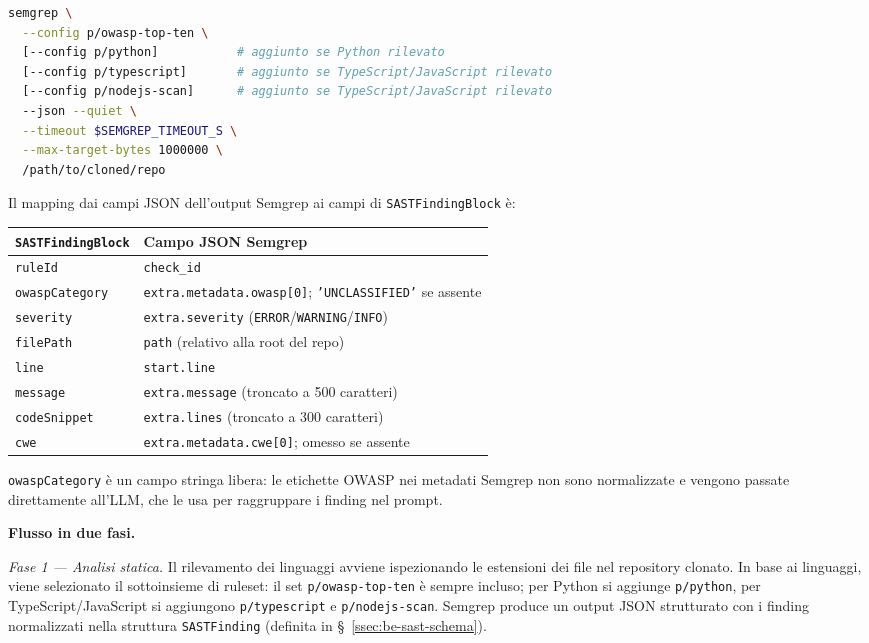 \documentclass[11pt,a4paper]{article}
\begin{document}
\begin{lstlisting}[language=bash, caption={Comando Semgrep invocato dal SECURITY agent come subprocess.}]
semgrep \
  --config p/owasp-top-ten \
  [--config p/python]           # aggiunto se Python rilevato
  [--config p/typescript]       # aggiunto se TypeScript/JavaScript rilevato
  [--config p/nodejs-scan]      # aggiunto se TypeScript/JavaScript rilevato
  --json --quiet \
  --timeout $SEMGREP_TIMEOUT_S \
  --max-target-bytes 1000000 \
  /path/to/cloned/repo
\end{lstlisting}

\noindent Il mapping dai campi JSON dell'output Semgrep ai campi di \texttt{SASTFindingBlock} è:

\begin{center}
\renewcommand{\arraystretch}{1.15}
\begin{tabular}{ll}
\toprule
\texttt{SASTFindingBlock} & Campo JSON Semgrep \\
\midrule
\texttt{ruleId}           & \texttt{check\_id} \\
\texttt{owaspCategory}    & \texttt{extra.metadata.owasp[0]}; \texttt{'UNCLASSIFIED'} se assente \\
\texttt{severity}         & \texttt{extra.severity} (\texttt{ERROR}/\texttt{WARNING}/\texttt{INFO}) \\
\texttt{filePath}         & \texttt{path} (relativo alla root del repo) \\
\texttt{line}             & \texttt{start.line} \\
\texttt{message}          & \texttt{extra.message} (troncato a 500 caratteri) \\
\texttt{codeSnippet}      & \texttt{extra.lines} (troncato a 300 caratteri) \\
\texttt{cwe}              & \texttt{extra.metadata.cwe[0]}; omesso se assente \\
\bottomrule
\end{tabular}
\end{center}

\noindent \texttt{owaspCategory} è un campo stringa libera: le etichette OWASP nei metadati Semgrep non sono normalizzate e vengono passate direttamente all'LLM, che le usa per raggruppare i finding nel prompt.

\medskip
\noindent\textbf{Flusso in due fasi.}

\emph{Fase 1 --- Analisi statica.} Il rilevamento dei linguaggi avviene ispezionando le estensioni dei file nel repository clonato. In base ai linguaggi, viene selezionato il sottoinsieme di ruleset: il set \texttt{p/owasp-top-ten} è sempre incluso; per Python si aggiunge \texttt{p/python}, per TypeScript/JavaScript si aggiungono \texttt{p/typescript} e \texttt{p/nodejs-scan}. Semgrep produce un output JSON strutturato con i finding normalizzati nella struttura \texttt{SASTFinding} (definita in \S~\ref{ssec:be-sast-schema}).
\end{document}

